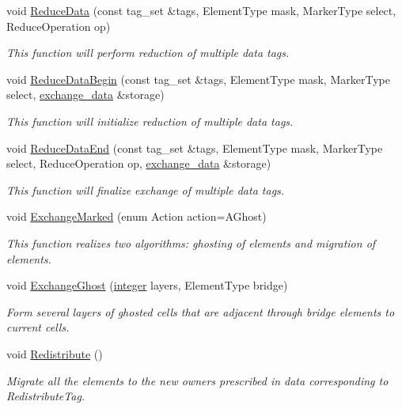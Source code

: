 \begin{DoxyCompactItemize}
void \hyperlink{classINMOST_1_1Mesh_a831a8bab953c4d8aa102e58bac81c25f}{Reduce\-Data} (const tag\-\_\-set \&tags, Element\-Type mask, Marker\-Type select, Reduce\-Operation op)
\begin{DoxyCompactList}\small\item\em This function will perform reduction of multiple data tags. \end{DoxyCompactList}\item 
void \hyperlink{classINMOST_1_1Mesh_a71c5b8a155e89d182f18e26dbe4b8670}{Reduce\-Data\-Begin} (const tag\-\_\-set \&tags, Element\-Type mask, Marker\-Type select, \hyperlink{classINMOST_1_1Mesh_1_1exchange__data}{exchange\-\_\-data} \&storage)
\begin{DoxyCompactList}\small\item\em This function will initialize reduction of multiple data tags. \end{DoxyCompactList}\item 
void \hyperlink{classINMOST_1_1Mesh_aabf4380aa2878e72cf399f97598dcebe}{Reduce\-Data\-End} (const tag\-\_\-set \&tags, Element\-Type mask, Marker\-Type select, Reduce\-Operation op, \hyperlink{classINMOST_1_1Mesh_1_1exchange__data}{exchange\-\_\-data} \&storage)
\begin{DoxyCompactList}\small\item\em This function will finalize exchange of multiple data tags. \end{DoxyCompactList}\item 
void \hyperlink{classINMOST_1_1Mesh_ae44b9cfcb8964acbd710562df331a51a}{Exchange\-Marked} (enum Action action=A\-Ghost)
\begin{DoxyCompactList}\small\item\em This function realizes two algorithms\-: ghosting of elements and migration of elements. \end{DoxyCompactList}\item 
void \hyperlink{classINMOST_1_1Mesh_ad2f72e7c09e74aa9962721646a627650}{Exchange\-Ghost} (\hyperlink{classINMOST_1_1Storage_aec96942bc647417a801e2895b45964d2}{integer} layers, Element\-Type bridge)
\begin{DoxyCompactList}\small\item\em Form several layers of ghosted cells that are adjacent through bridge elements to current cells. \end{DoxyCompactList}\item 
void \hyperlink{classINMOST_1_1Mesh_ade20ec7c8563e82bf8057bc47a3314b7}{Redistribute} ()
\begin{DoxyCompactList}\small\item\em Migrate all the elements to the new owners prescribed in data corresponding to Redistribute\-Tag. \end{DoxyCompactList}\item 

\end{DoxyCompactItemize}
